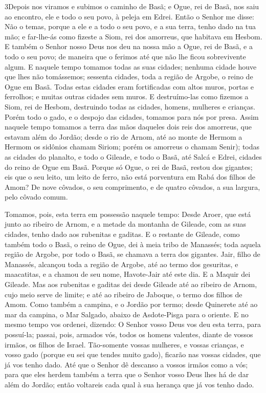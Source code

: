 \lettrine{3} Depois nos viramos e subimos o caminho de Basã; e
Ogue, rei de Basã, nos saiu ao encontro, ele e todo o seu povo, à
peleja em Edrei. Então o Senhor me disse: Não o temas, porque a
ele e a todo o seu povo, e a sua terra, tenho dado na tua mão; e
far-lhe-ás como fizeste a Siom, rei dos amorreus, que habitava em
Hesbom. E também o Senhor nosso Deus nos deu na nossa mão a
Ogue, rei de Basã, e a todo o seu povo; de maneira que o ferimos até
que não lhe ficou sobrevivente algum. E naquele tempo tomamos
todas as suas cidades; nenhuma cidade houve que lhes não tomássemos;
sessenta cidades, toda a região de Argobe, o reino de Ogue em Basã.
Todas estas cidades eram fortificadas com altos muros, portas e
ferrolhos; e muitas outras cidades sem muros. E destruímo-las
como fizemos a Siom, rei de Hesbom, destruindo todas as cidades,
homens, mulheres e crianças. Porém todo o gado, e o despojo das
cidades, tomamos para nós por presa. Assim naquele tempo tomamos
a terra das mãos daqueles dois reis dos amorreus, que estavam além
do Jordão; desde o rio de Arnom, até ao monte de Hermom a Hermom
os sidônios chamam Siriom; porém os amorreus o chamam Senir);
todas as cidades do planalto, e todo o Gileade, e todo o
Basã, até Salcá e Edrei, cidades do reino de Ogue em Basã.
Porque só Ogue, o rei de Basã, restou dos gigantes; eis que o
seu leito, um leito de ferro, não está porventura em Rabá dos filhos
de Amom? De nove côvados, o seu comprimento, e de quatro côvados, a
sua largura, pelo côvado comum.

Tomamos, pois, esta terra em possessão naquele tempo: Desde
Aroer, que está junto ao ribeiro de Arnom, e a metade da montanha de
Gileade, com as suas cidades, tenho dado aos rubenitas e gaditas.
E o restante de Gileade, como também todo o Basã, o reino de
Ogue, dei à meia tribo de Manassés; toda aquela região de Argobe,
por todo o Basã, se chamava a terra dos gigantes. Jair, filho
de Manassés, alcançou toda a região de Argobe, até ao termo dos
gesuritas, e maacatitas, e a chamou de seu nome, Havote-Jair até
este dia. E a Maquir dei Gileade. Mas aos rubenitas e
gaditas dei desde Gileade até ao ribeiro de Arnom, cujo meio serve
de limite; e até ao ribeiro de Jaboque, o termo dos filhos de Amom.
Como também a campina, e o Jordão por termo; desde Quinerete
até ao mar da campina, o Mar Salgado, abaixo de Asdote-Pisga para o
oriente. E no mesmo tempo vos ordenei, dizendo: O Senhor
vosso Deus vos deu esta terra, para possuí-la; passai, pois, armados
vós, todos os homens valentes, diante de vossos irmãos, os filhos de
Israel. Tão-somente vossas mulheres, e vossas crianças, e
vosso gado (porque eu sei que tendes muito gado), ficarão nas vossas
cidades, que já vos tenho dado. Até que o Senhor dê descanso
a vossos irmãos como a vós; para que eles herdem também a terra que
o Senhor vosso Deus lhes há de dar além do Jordão; então voltareis
cada qual à sua herança que já vos tenho dado.


